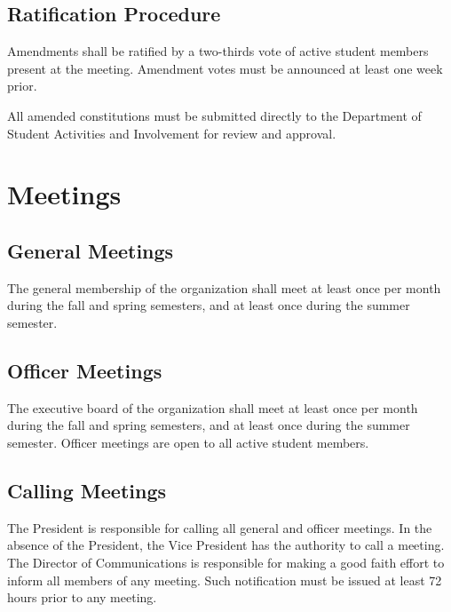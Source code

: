 \documentclass{article}
\begin{document}
\subsection{Ratification Procedure}
Amendments shall be ratified by a two-thirds vote of active student members present at the meeting. Amendment votes must be announced at least one week prior. 

All amended constitutions must be submitted directly to the Department of Student Activities and Involvement for review and approval. 


\section{Meetings}
\subsection{General Meetings}
The general membership of the organization shall meet at least once per month during the fall and spring semesters, and at least once during the summer semester.

\subsection{Officer Meetings}
The executive board of the organization shall meet at least once per month during the fall and spring semesters, and at least once during the summer semester. Officer meetings are open to all active student members.

\subsection{Calling Meetings}
The President is responsible for calling all general and officer meetings. In the absence of the President, the Vice President has the authority to call a meeting. The Director of Communications is responsible for making a good faith effort to inform all members of any meeting. Such notification must be issued at least 72 hours prior to any meeting.
\end{document}

